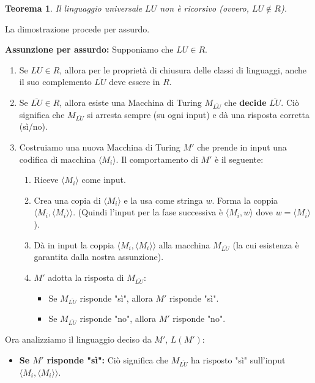 \documentclass[a4paper]{article}
\makeatletter
\newtheorem{theorem}{Teorema}[section] %
\renewenvironment{proof}[1][\proofname]{\par
  \pushQED{\qed}%
  \normalfont \topsep6\p@\@plus6\p@\relax
  \trivlist
  \item[\hskip\labelsep
        \bfseries
    #1\@addpunct{.}]\ignorespaces
}{%
  \popQED\endtrivlist\@endpefalse
}
\makeatother
\begin{document}
\begin{theorem}
Il linguaggio universale $LU$ non è ricorsivo (ovvero, $LU \notin R$).
\end{theorem}
\begin{proof}
La dimostrazione procede per assurdo.

\textbf{Assunzione per assurdo:} Supponiamo che $LU \in R$.
\begin{enumerate}
    \item Se $LU \in R$, allora per le proprietà di chiusura delle classi di linguaggi, anche il suo complemento $\overline{LU}$ deve essere in $R$.
    \item Se $\overline{LU} \in R$, allora esiste una Macchina di Turing $M_{\overline{LU}}$ che \textbf{decide} $\overline{LU}$. Ciò significa che $M_{\overline{LU}}$ si arresta sempre (su ogni input) e dà una risposta corretta (sì/no).
    \item Costruiamo una nuova Macchina di Turing $M'$ che prende in input una codifica di macchina $\langle M_i \rangle$. Il comportamento di $M'$ è il seguente:
    \begin{enumerate}
        \item Riceve $\langle M_i \rangle$ come input.
        \item Crea una copia di $\langle M_i \rangle$ e la usa come stringa $w$. Forma la coppia $\langle M_i, \langle M_i \rangle \rangle$. (Quindi l'input per la fase successiva è $\langle M_i, w \rangle$ dove $w = \langle M_i \rangle$).
        \item Dà in input la coppia $\langle M_i, \langle M_i \rangle \rangle$ alla macchina $M_{\overline{LU}}$ (la cui esistenza è garantita dalla nostra assunzione).
        \item $M'$ adotta la risposta di $M_{\overline{LU}}$:
        \begin{itemize}
            \item Se $M_{\overline{LU}}$ risponde "sì", allora $M'$ risponde "sì".
            \item Se $M_{\overline{LU}}$ risponde "no", allora $M'$ risponde "no".
        \end{itemize}
    \end{enumerate}
\end{enumerate}
Ora analizziamo il linguaggio deciso da $M'$, $L(M')$:
\begin{itemize}
    \item \textbf{Se $M'$ risponde "sì":}
    Ciò significa che $M_{\overline{LU}}$ ha risposto "sì" sull'input $\langle M_i, \langle M_i \rangle \rangle$.

\end{itemize}
\end{proof}
\end{document}
